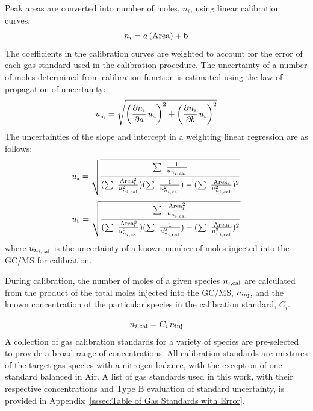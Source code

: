 \documentclass[12pt]{article}
\begin{document}
Peak areas are converted into number of moles, $n_{i}$, using linear calibration curves.
\begin{equation}
\label{eq:Calibration Curve}
n_{i\rm} = a \, (\rm {Area})+b
\end{equation}
The coefficients in the calibration curves are weighted to account for the error of each gas standard used in the calibration procedure. The uncertainty of a number of moles determined from calibration function is estimated using the law of propagation of uncertainty:
\begin{equation}
\label{eq:Given_Moles_Uncertainty}
 u_{\rm \scriptscriptstyle n_{i}} = \sqrt{{\left( \frac{\partial n_{i}}{\partial a}\,u_{\scriptscriptstyle a} \right)}^2+{\left(\frac{\partial {n_{i}}}{\partial b}\,u_{\scriptscriptstyle b}\right)}^2}
\end{equation}
The uncertainties of the slope and intercept in a weighting linear regression are as follows:
\begin{equation}
\label{eq:Slope_Uncertainty}
u_{\rm \scriptscriptstyle a} =\sqrt{\frac{\sum~\frac{1}{u_{n_{i,\rm cal}}}}{(\sum~\frac{\rm{Area}_{i}^2}{{u_{n_{i,\rm cal}}^2}})(\sum~\frac{1}{{u_{n_{i,\rm cal}}^2}})-(\sum~\frac{\rm{Area}_{i}}{{u_{n_{i,\rm cal}}^2}})^2}}
\end{equation}
\begin{equation}
\label{eq:Intercept_Uncertainty}
u_{\rm \scriptscriptstyle b} =\sqrt{\frac{\sum~\frac{\rm{Area}_{i}^2}{u_{n_{i,\rm cal}}}}{(\sum~\frac{\rm{Area}_{i}^2}{{u_{n_{i,\rm cal}}^2}})(\sum~\frac{1}{{u_{n_{i,\rm cal}}^2}})-(\sum~\frac{\rm{Area}_{i}}{{u_{n_{i,\rm cal}}^2}})^2}}
\end{equation}
where $u_{n_{i,\rm cal}}$ is the uncertainty of a known number of moles injected into the GC/MS for calibration.

During calibration, the number of moles of a given species $n_{i,\rm cal}$ are calculated from the product of the total moles injected into the GC/MS, $n_{\rm inj}$, and the known concentration of the particular species in the calibration standard, $C_{i}$.

\begin{equation}
\label{eq:Cal_Moles}
n_{i,\rm cal} = C_{i} \, n_{\rm inj}
\end{equation}
A collection of gas calibration standards for a variety of species are pre-selected to provide a broad range of concentrations. All calibration standards are mixtures of the target gas species with a nitrogen balance, with the exception of one standard balanced in Air. A list of gas standards used in this work, with their respective concentrations and Type B evaluation of standard uncertainty, is provided in Appendix~\ref{sssec:Table of Gas Standards with Error}.
\end{document}
